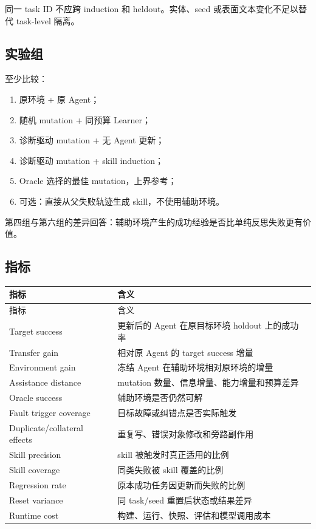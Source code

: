 \documentclass[11pt,a4paper,fontset=fandol]{ctexart}
\begin{document}
同一 task ID 不应跨 induction 和 heldout。实体、seed 或表面文本变化不足以替代 task-level 隔离。

\subsection{实验组}

至少比较：

\begin{enumerate}
  \item 原环境 + 原 Agent；
  \item 随机 mutation + 同预算 Learner；
  \item 诊断驱动 mutation + 无 Agent 更新；
  \item 诊断驱动 mutation + skill induction；
  \item Oracle 选择的最佳 mutation，上界参考；
  \item 可选：直接从父失败轨迹生成 skill，不使用辅助环境。
\end{enumerate}

第四组与第六组的差异回答：辅助环境产生的成功经验是否比单纯反思失败更有价值。

\subsection{指标}

\begin{longtable}{L{3.7cm}L{10.7cm}}
\toprule
指标 & 含义 \\
\midrule
\endfirsthead
\toprule
指标 & 含义 \\
\midrule
\endhead
Target success & 更新后的 Agent 在原目标环境 holdout 上的成功率 \\
Transfer gain & 相对原 Agent 的 target success 增量 \\
Environment gain & 冻结 Agent 在辅助环境相对原环境的增量 \\
Assistance distance & mutation 数量、信息增量、能力增量和预算差异 \\
Oracle success & 辅助环境是否仍然可解 \\
Fault trigger coverage & 目标故障或纠错点是否实际触发 \\
Duplicate/collateral effects & 重复写、错误对象修改和旁路副作用 \\
Skill precision & skill 被触发时真正适用的比例 \\
Skill coverage & 同类失败被 skill 覆盖的比例 \\
Regression rate & 原本成功任务因更新而失败的比例 \\
Reset variance & 同 task/seed 重置后状态或结果差异 \\
Runtime cost & 构建、运行、快照、评估和模型调用成本 \\
\bottomrule
\end{longtable}
\end{document}
